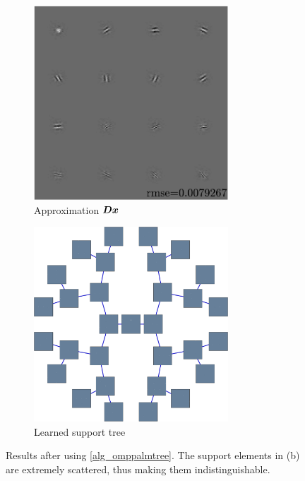 \begin{figure}[!h] \centering
\begin{subfigure}[b]{0.49\textwidth}\centering
\includegraphics[width=0.8\textwidth]{figures/tree-scattered-supports/xp_learnsupp256_curvelet_decomp3+tree-binary_dpth4+supp-diracs+usegrad0_every5_add5_totinit0_totadd279_a0_b1_approx.pdf}
\caption{Approximation $\bm{D}\bm{x}$}
\end{subfigure}
\begin{subfigure}[b]{0.49\textwidth}\centering
\includegraphics[width=0.8\textwidth]{figures/tree-scattered-supports/xp_learnsupp256_curvelet_decomp3+tree-binary_dpth4+supp-diracs+usegrad0_every5_add5_totinit0_totadd279_a0_b1_tree.pdf}
	\caption{Learned support tree}\label{fig_test_omppalmtree_tree}
\end{subfigure}
\caption{Results after using \cref{alg_omppalmtree}. The support elements in (b) are extremely scattered, thus making them indistinguishable.}\label{fig_test_omppalmtree}
\end{figure}

